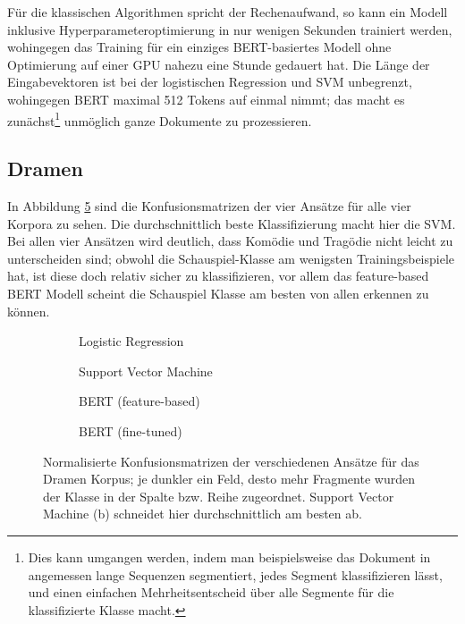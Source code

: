 Für die klassischen Algorithmen spricht der Rechenaufwand, so kann ein Modell inklusive Hyperparameteroptimierung in nur wenigen Sekunden 
trainiert werden, wohingegen das Training für ein einziges BERT-basiertes Modell ohne Optimierung auf einer GPU nahezu eine Stunde gedauert hat. 
Die Länge der Eingabevektoren ist bei der logistischen Regression und SVM unbegrenzt, wohingegen BERT maximal 512 Tokens auf einmal nimmt; das 
macht es zunächst\footnote{Dies kann umgangen werden, indem man beispielsweise das Dokument in angemessen lange Sequenzen segmentiert, 
jedes Segment klassifizieren lässt, und einen einfachen Mehrheitsentscheid über alle Segmente für die klassifizierte Klasse macht.} unmöglich 
ganze Dokumente zu prozessieren.



\subsection{Dramen}
\label{dramen_diskussion}
In Abbildung \ref{fig:drama} sind die Konfusionsmatrizen der vier Ansätze für alle vier Korpora zu sehen. Die durchschnittlich beste Klassifizierung macht hier die SVM. Bei allen vier Ansätzen wird deutlich, dass Komödie und Tragödie nicht leicht zu unterscheiden sind; obwohl die Schauspiel-Klasse am wenigsten Trainingsbeispiele hat, ist diese doch relativ sicher zu klassifizieren, vor allem das feature-based BERT Modell scheint die Schauspiel Klasse am besten von allen erkennen zu können.

\begin{figure}
\centering
\begin{subfigure}[b]{.45\linewidth}

\caption{Logistic Regression}\label{fig:drama-log}
\end{subfigure}
\begin{subfigure}[b]{.45\linewidth}

\caption{Support Vector Machine}\label{fig:drama-svm}
\end{subfigure}

\begin{subfigure}[b]{.45\linewidth}

\caption{BERT (feature-based)}\label{fig:drama-feat}
\end{subfigure}
\begin{subfigure}[b]{.45\linewidth}

\caption{BERT (fine-tuned)}\label{fig:drama-fine}
\end{subfigure}
\caption{Normalisierte Konfusionsmatrizen der verschiedenen Ansätze für das Dramen Korpus; je dunkler ein Feld, desto mehr Fragmente wurden der Klasse in der Spalte bzw. Reihe zugeordnet. Support Vector Machine (b) schneidet hier durchschnittlich am besten ab.}
\label{fig:drama}
\end{figure}




